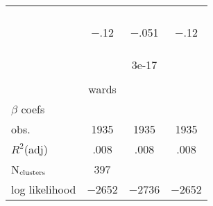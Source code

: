
    \renewcommand{\ctNtabCols}{4}
    \renewcommand{\ctFirstHeader}{\ctSubsequentHeaders \hline }
    \renewcommand{\ctSubsequentHeaders}{	&\multicolumn{2}{c}{\sltcheadername{aq1}}	&\multicolumn{1}{c}{\sltcheadername{Special}}\\ 
	&\sltcheadername{(1)}	&\sltcheadername{(2)}	&\sltcheadername{(3)}\\ 
}
    \renewcommand{\ctBody}{\sltrheadername{conservatives handle crime}	& \wrapSigFivePercent{$-$.042}	& \wrapSigFivePercent{$-$.068}	& \wrapSigFivePercent{$-$.042}\\ 
\showSEs{	& \coefse{.021}	& \coefse{.034}	& \coefse{.020} \\ }{}
\sltrheadername{aq6a}	& $-$.12	& $-$.051	& $-$.12\\ 
\showSEs{	& \coefse{.071}	& \coefse{.031}	& \coefse{.071} \\ }{}
\sltrheadername{aq7a}	& \wrapSigFivePercent{.21}	& \wrapSigFivePercent{.060}	& \wrapSigFivePercent{.21}\\ 
\showSEs{	& \coefse{.10}	& \coefse{.027}	& \coefse{.097} \\ }{}
\sltrheadername{constant}	& \wrapSigOneThousandth{2.2}	& 3e-17	& \wrapSigOneThousandth{2.2}\\ 
\showSEs{	& \coefse{.057}	& \coefse{.028}	& \coefse{.056} \\ }{}
\hline 
clustering	& wards	& 	& \\ 
$\beta$ coefs	& 	& \YesMark	& \\ 
obs.	& 1935	& 1935	& 1935\\ 
$R^2$(adj)	& .008	& .008	& .008\\ 
N$_{\rm clusters}$	& 397	& 	& \\ 
log likelihood	& $-$2652	& $-$2736	& $-$2652\\ 
}
    
    \renewcommand{\ctCaption}{ {\color{blue} simple demo \footnotesize \cpblColourLegend   Regression carried out on Sat Oct 25 10:38:10 2014 Regression methods: ['reg']. Dependent vars: ['aq1']  Common model: aq5a aq6a aq7a  if 1 } }
    \ifx\@ctUsingWrapper\@empty
    \begin{table}
    \begin{tabular}{lc|cc}
    \ctFirstHeader
    \ctBody
    \end{tabular}
    \end{table}
    \else
    \fi

